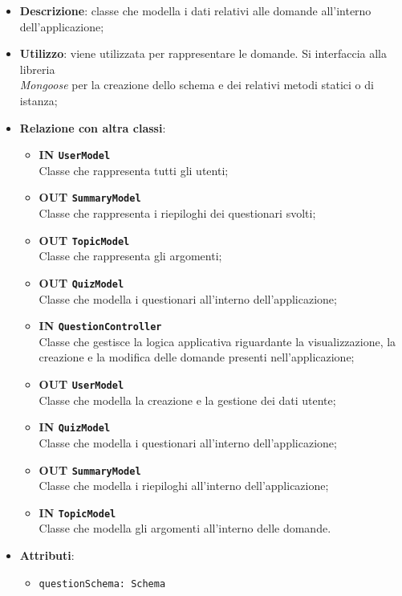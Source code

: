 	\begin{itemize}
		\item \textbf{Descrizione}: classe che modella i dati relativi alle domande all'interno dell'applicazione;	
		\item \textbf{Utilizzo}: viene utilizzata per rappresentare le domande. Si interfaccia alla libreria \\\textit{Mongoose} per la creazione dello schema e dei relativi metodi statici o di istanza;
		\item \textbf{Relazione con altra classi}:
			\begin{itemize}
			\item \textbf{IN \texttt{UserModel}} \\
			Classe che rappresenta tutti gli utenti;
			\item \textbf{OUT \texttt{SummaryModel} }\\
			Classe che rappresenta i riepiloghi dei questionari svolti;
			\item \textbf{OUT \texttt{TopicModel}} \\
			Classe che rappresenta gli argomenti;
			\item \textbf{OUT \texttt{QuizModel}} \\
			Classe che modella i questionari all'interno dell'applicazione;
			\item \textbf{IN \texttt{QuestionController}} \\
			Classe che gestisce la logica applicativa riguardante la visualizzazione, la creazione e la modifica delle domande presenti nell'applicazione;
			\item \textbf{OUT \texttt{UserModel}} \\
			Classe che modella la creazione e la gestione dei dati utente;
			\item \textbf{IN \texttt{QuizModel}} \\
			Classe che modella i questionari all'interno dell'applicazione;
			\item \textbf{OUT \texttt{SummaryModel}} \\
			Classe che modella i riepiloghi all'interno dell'applicazione;
			\item \textbf{IN \texttt{TopicModel}} \\
			Classe che modella gli argomenti all'interno delle domande.
			\end{itemize}
		\item \textbf{Attributi}:
	\begin{itemize}
		\item \texttt{questionSchema: Schema} \\

\end{itemize}
\end{itemize}
